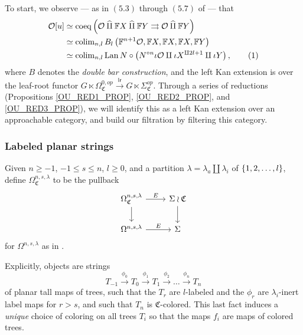 \documentclass[a4paper,10pt
,draft
]{article}%
\renewcommand{\hat}{\widehat}
\renewcommand{\1}{\eta}%
\newcommand{\OC}{\Omega_{\mathfrak C}}
\begin{document}
To start, we observe ---  as in $(5.3)$ through $(5.7)$ of \cite{BP_geo} --- that
\begin{align*}
  \O[u]
  &
    \simeq \mathrm{coeq}\left(
          \O \mathbin{\hat\amalg} \mathbb F X \mathbin{\hat\amalg} \mathbb F Y \rightrightarrows \O \mathbin{\hat\amalg} \mathbb F Y
          \right)
  \\
  &
    \simeq \colim_{n,l} B_l \left( \mathbb F^{n+1} \O, \mathbb F X, \mathbb F X, \mathbb F X, \mathbb FY \right)
  \\
  &
    \simeq \colim_{n,l} \Lan N \circ \left( N^{\circ n} \iota \O \amalg \iota X^{\amalg 2l +1} \amalg \iota Y \right),
    \stepcounter{equation}\tag{\theequation}\label{OU_EQ1}
\end{align*}
where $B$ denotes the \textit{double bar construction},
and the left Kan extension is over the leaf-root functor
\mbox{$G \ltimes \Omega_{\mathfrak C}^{0,op} \xrightarrow{\mathsf{lr}} G \ltimes \Sigma_{\mathfrak C}^{op}$}.
Through a series of reductions (Propositions \ref{OU_RED1_PROP}, \ref{OU_RED2_PROP}, and \ref{OU_RED3_PROP}),
we will identify this as a left Kan extension over an approachable category, 
and build our filtration by filtering this category.

\subsubsection{Labeled planar strings}

\begin{definition}
      Given $n\geq -1$, $-1 \leq s \leq n$, $l \geq 0$, and a partition $\lambda = \lambda_a \amalg \lambda_i$ of $\left\{1,2,\dots,l\right\}$, 
      define $\Omega_{\mathfrak C}^{n,s,\lambda}$ to be the pullback
      \begin{equation}
            \begin{tikzcd}
                  \OC^{n,s,\lambda} \arrow[d] \arrow[r, "E"]
                  &
                  \Sigma \wr \mathfrak C \arrow[d]
                  \\
                  \Omega^{n,s,\lambda} \arrow[r, "E"]
                  &
                  \Sigma
            \end{tikzcd}
      \end{equation}
      for $\Omega^{n,s,\lambda}$ as in \cite[Defn. 5.10]{BP_geo}.

      Explicitly, objects are strings
      \begin{equation}
            T_{-1} \xrightarrow{\phi_0} T_0 \xrightarrow{\phi_1} T_1 \xrightarrow{\phi_2} \dots \xrightarrow{\phi_n} T_n
      \end{equation}
      of planar tall maps of trees, such that
      the $T_r$ are $l$-labeled and the $\phi_r$ are $\lambda_i$-inert label maps for $r > s$,
      and such that $T_n$ is $\mathfrak C$-colored.
      This last fact induces a \textit{unique} choice of coloring on all trees $T_i$ so that the maps $f_i$ are maps of colored trees.      
\end{definition}
\end{document}
